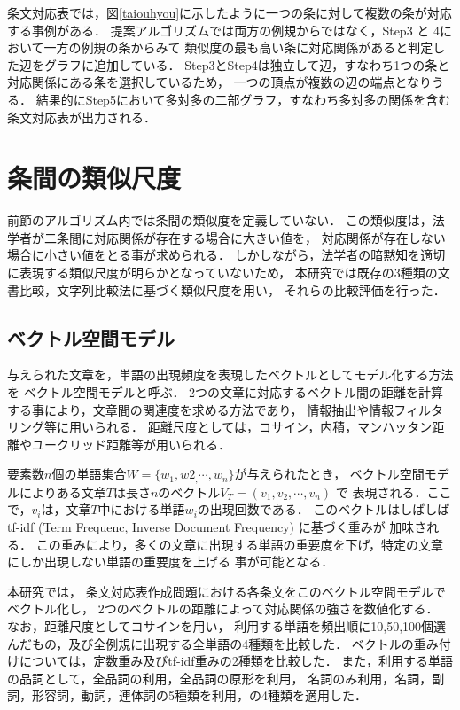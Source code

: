 \documentclass[japanese]{jnlp_1.4}
\begin{document}
条文対応表では，図\ref{taiouhyou}に示したように一つの条に対して複数の条が対応する事例がある．
提案アルゴリズムでは両方の例規からではなく，Step3 と 4において一方の例規の条からみて
類似度の最も高い条に対応関係があると判定した辺をグラフに追加している．
Step3とStep4は独立して辺，すなわち1つの条と対応関係にある条を選択しているため，
一つの頂点が複数の辺の端点となりうる．
結果的にStep5において多対多の二部グラフ，すなわち多対多の関係を含む条文対応表が出力される．



\section{条間の類似尺度}
\label{sec:method}

前節のアルゴリズム内では条間の類似度を定義していない．
この類似度は，法学者が二条間に対応関係が存在する場合に大きい値を，
対応関係が存在しない場合に小さい値をとる事が求められる．
しかしながら，法学者の暗黙知を適切に表現する類似尺度が明らかとなっていないため，
本研究では既存の3種類の文書比較，文字列比較法に基づく類似尺度を用い，
それらの比較評価を行った．



\subsection{ベクトル空間モデル}

与えられた文章を，単語の出現頻度を表現したベクトルとしてモデル化する方法を
ベクトル空間モデルと呼ぶ\cite{salton1975vector}．
2つの文章に対応するベクトル間の距離を計算する事により，文章間の関連度を求める方法であり，
情報抽出や情報フィルタリング等に用いられる．
距離尺度としては，コサイン，内積，マンハッタン距離やユークリッド距離等が用いられる．

要素数$n$個の単語集合$W=\{w_1,w2_,\cdots,w_n\}$が与えられたとき，
ベクトル空間モデルによりある文章$T$は長さ$n$のベクトル$V_T = (v_1,v_2,\cdots,v_n)$ で
表現される．ここで，$v_i$は，文章$T$中における単語$w_i$の出現回数である．
このベクトルはしばしばtf-idf (Term Frequenc, Inverse Document Frequency) に基づく重みが
加味される．
この重みにより，多くの文章に出現する単語の重要度を下げ，特定の文章にしか出現しない単語の重要度を上げる
事が可能となる．

本研究では，
条文対応表作成問題における各条文をこのベクトル空間モデルでベクトル化し，
2つのベクトルの距離によって対応関係の強さを数値化する．
なお，距離尺度としてコサインを用い，
利用する単語を頻出順に10,50,100個選んだもの，及び全例規に出現する全単語の4種類を比較した．
ベクトルの重み付けについては，定数重み及びtf-idf重みの2種類を比較した．
また，利用する単語の品詞として，全品詞の利用，全品詞の原形を利用，
名詞のみ利用，名詞，副詞，形容詞，動詞，連体詞の5種類を利用，の4種類を適用した．
\end{document}
